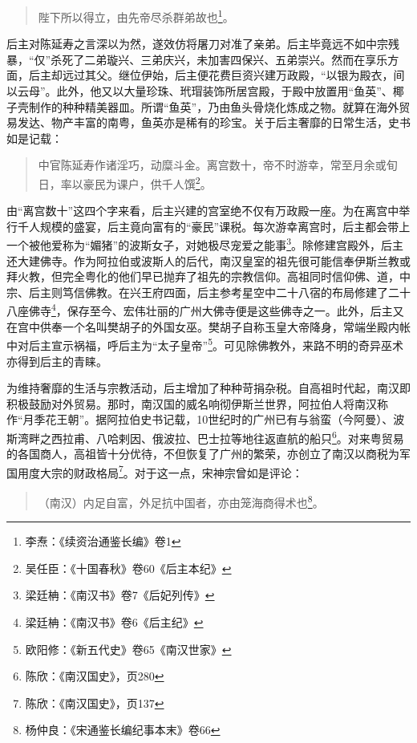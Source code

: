 \begin{quote}
	陛下所以得立，由先帝尽杀群弟故也\footnote{李焘：《续资治通鉴长编》卷1}。
\end{quote}


后主对陈延寿之言深以为然，遂效仿将屠刀对准了亲弟。后主毕竟远不如中宗残暴，“仅”杀死了二弟璇兴、三弟庆兴，未加害四保兴、五弟崇兴。然而在享乐方面，后主却远过其父。继位伊始，后主便花费巨资兴建万政殿，“以银为殿衣，间以云母”。此外，他又以大量珍珠、玳瑁装饰所居宫殿，于殿中放置用“鱼英”、椰子壳制作的种种精美器皿。所谓“鱼英”，乃由鱼头骨烧化炼成之物。就算在海外贸易发达、物产丰富的南粤，鱼英亦是稀有的珍宝。关于后主奢靡的日常生活，史书如是记载：

\begin{quote}
	中官陈延寿作诸淫巧，动糜斗金。离宫数十，帝不时游幸，常至月余或旬日，率以豪民为课户，供千人馔\footnote{吴任臣：《十国春秋》卷60《后主本纪》}。
\end{quote}


由“离宫数十”这四个字来看，后主兴建的宫室绝不仅有万政殿一座。为在离宫中举行千人规模的盛宴，后主竟向富有的“豪民”课税。每次游幸离宫时，后主都会带上一个被他爱称为“媚猪”的波斯女子，对她极尽宠爱之能事\footnote{梁廷柟：《南汉书》卷7《后妃列传》}。除修建宫殿外，后主还大建佛寺。作为阿拉伯或波斯人的后代，南汉皇室的祖先很可能信奉伊斯兰教或拜火教，但完全粤化的他们早已抛弃了祖先的宗教信仰。高祖同时信仰佛、道，中宗、后主则笃信佛教。在兴王府四面，后主参考星空中二十八宿的布局修建了二十八座佛寺\footnote{梁廷柟：《南汉书》卷6《后主纪》}，保存至今、宏伟壮丽的广州大佛寺便是这些佛寺之一。此外，后主又在宫中供奉一个名叫樊胡子的外国女巫。樊胡子自称玉皇大帝降身，常端坐殿内帐中对后主宣示祸福，呼后主为“太子皇帝”\footnote{欧阳修：《新五代史》卷65《南汉世家》}。可见除佛教外，来路不明的奇异巫术亦得到后主的青睐。

为维持奢靡的生活与宗教活动，后主增加了种种苛捐杂税。自高祖时代起，南汉即积极鼓励对外贸易。那时，南汉国的威名响彻伊斯兰世界，阿拉伯人将南汉称作“月季花王朝”。据阿拉伯史书记载，10世纪时的广州已有与翁蛮（今阿曼）、波斯湾畔之西拉甫、八哈剌因、俄波拉、巴士拉等地往返直航的船只\footnote{陈欣：《南汉国史》，页280}。对来粤贸易的各国商人，高祖皆十分优待，不但恢复了广州的繁荣，亦创立了南汉以商税为军国用度大宗的财政格局\footnote{陈欣：《南汉国史》，页137}。对于这一点，宋神宗曾如是评论：

\begin{quote}
	（南汉）内足自富，外足抗中国者，亦由笼海商得术也\footnote{杨仲良：《宋通鉴长编纪事本末》卷66}。
\end{quote}


